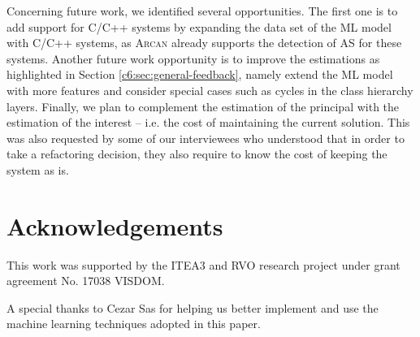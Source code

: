 Concerning future work, we identified several opportunities. The first one is to add support for C/C++ systems by expanding the data set of the ML model with C/C++ systems, as \textsc{Arcan} already supports the detection of AS for these systems.
Another future work opportunity is to improve the estimations as highlighted in Section \ref{c6:sec:general-feedback}, namely extend the ML model with more features and consider special cases such as cycles in the class hierarchy layers.
Finally, we plan to complement the estimation of the principal with the estimation of the interest -- i.e. the cost of maintaining the current solution.
This was also requested by some of our interviewees who understood that in order to take a refactoring decision, they also require to know the cost of keeping the system as is.


\section*{Acknowledgements}
This work was supported by the ITEA3 and RVO research project under grant agreement No. 17038 VISDOM.

A special thanks to Cezar Sas for helping us better implement and use the machine learning techniques adopted in this paper.
